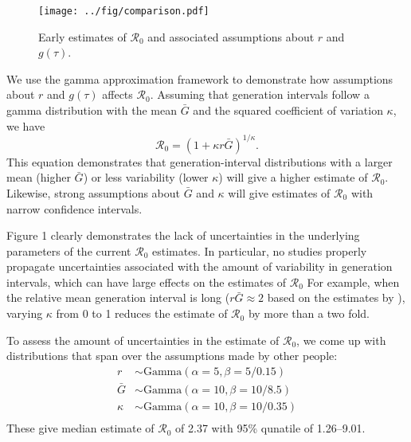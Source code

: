 \documentclass[12pt]{article}
\begin{document}
\begin{figure}[t]
\texttt{[image: ../fig/comparison.pdf]}
\caption{
Early estimates of $\mathcal R_0$ and associated assumptions about $r$ and $g(\tau)$.
}
\end{figure}

We use the gamma approximation framework to demonstrate
how assumptions about $r$ and $g(\tau)$
affects $\mathcal R_0$.
Assuming that generation intervals follow a gamma distribution 
with the mean $\bar G$ and the squared coefficient of variation $\kappa$, 
we have
\begin{equation}
\mathcal R_0 = \left(1 + \kappa r \bar{G}\right)^{1/\kappa}.
\end{equation}
This equation demonstrates that generation-interval distributions
with a larger mean (higher $\bar{G}$) or less variability (lower $\kappa$)
will give a higher estimate of $\mathcal R_0$.
Likewise, strong assumptions about $\bar{G}$ and $\kappa$ will give
estimates of $\mathcal R_0$ with narrow confidence intervals.

Figure 1 clearly demonstrates the lack of uncertainties in the underlying parameters
of the current $\mathcal R_0$ estimates.
In particular, no studies properly propagate uncertainties associated with the
amount of variability in generation intervals, which can have 
large effects on the estimates of $\mathcal R_0$
For example, when the relative mean generation interval is long ($r\bar{G}\approx 2$ based on the estimates by \cite{zhaoncov}),
varying $\kappa$ from 0 to 1 reduces the estimate of $\mathcal R_0$ by more than a two fold.

To assess the amount of uncertainties in the estimate of $\mathcal R_0$,
we come up with distributions that span over the assumptions made by other people:
\begin{equation}
\begin{aligned}
r &\sim \mathrm{Gamma}(\alpha=5, \beta=5/0.15)\\
\bar{G} &\sim \mathrm{Gamma}(\alpha=10, \beta=10/8.5)\\
\kappa &\sim \mathrm{Gamma}(\alpha=10, \beta=10/0.35)\\
\end{aligned}
\end{equation}
These give median estimate of $\mathcal R_0$ of 2.37 with 95\% qunatile of 1.26--9.01.
\end{document}

